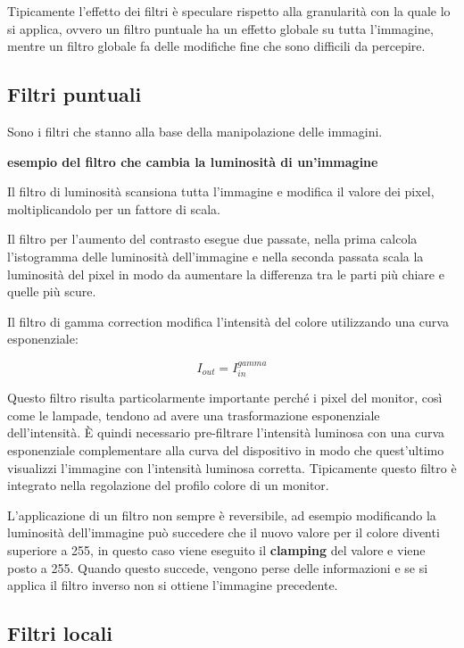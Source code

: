 Tipicamente l'effetto dei filtri è speculare rispetto alla granularità
con la quale lo si applica, ovvero un filtro puntuale ha un effetto
globale su tutta l'immagine, mentre un filtro globale fa delle modifiche
fine che sono difficili da percepire.

\subsection{Filtri puntuali}\label{filtri-puntuali}

Sono i filtri che stanno alla base della manipolazione delle immagini.

\textbf{esempio del filtro che cambia la luminosità di un'immagine}

Il filtro di luminosità scansiona tutta l'immagine e modifica il valore
dei pixel, moltiplicandolo per un fattore di scala.

Il filtro per l'aumento del contrasto esegue due passate, nella prima
calcola l'istogramma delle luminosità dell'immagine e nella seconda
passata scala la luminosità del pixel in modo da aumentare la differenza
tra le parti più chiare e quelle più scure.

Il filtro di gamma correction modifica l'intensità del colore
utilizzando una curva esponenziale:

$$
I_{out} = I_{in}^{gamma}
$$

Questo filtro risulta particolarmente importante perché i pixel del
monitor, così come le lampade, tendono ad avere una trasformazione
esponenziale dell'intensità. È quindi necessario pre-filtrare l'intensità
luminosa con una curva esponenziale complementare alla curva del
dispositivo in modo che quest'ultimo visualizzi l'immagine con
l'intensità luminosa corretta. Tipicamente questo filtro è integrato
nella regolazione del profilo colore di un monitor.

L'applicazione di un filtro non sempre è reversibile, ad esempio
modificando la luminosità dell'immagine può succedere che il nuovo
valore per il colore diventi superiore a 255, in questo caso viene
eseguito il \textbf{clamping} del valore e viene posto a 255. Quando
questo succede, vengono perse delle informazioni e se si applica il
filtro inverso non si ottiene l'immagine precedente.

\subsection{Filtri locali}\label{filtri-locali}

